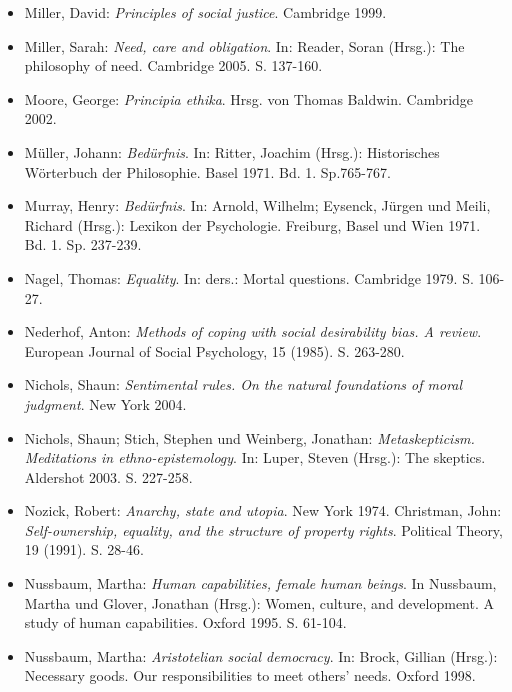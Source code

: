\documentclass[a4paper]{thesis}
\begin{document}
\begin{itemize}[leftmargin=1.5em,label={},itemindent=-1.5em, itemsep=-1ex]
\item Miller, David: \textit{Principles of social justice}. Cambridge 1999.

\item Miller, Sarah: \textit{Need, care and obligation}. In: Reader, Soran (Hrsg.): The philosophy of need. Cambridge 2005. S. 137-160.

\item Moore, George: \textit{Principia ethika}. Hrsg. von Thomas Baldwin. Cambridge 2002.

\item Müller, Johann: \textit{Bedürfnis}. In: Ritter, Joachim (Hrsg.): Historisches Wörterbuch der Philosophie. Basel 1971. Bd. 1. Sp.765-767.

\item Murray, Henry: \textit{Bedürfnis}. In: Arnold, Wilhelm; Eysenck, Jürgen und Meili, Richard (Hrsg.): Lexikon der Psychologie. Freiburg, Basel und Wien 1971. Bd. 1. Sp. 237-239.

\item Nagel, Thomas: \textit{Equality}. In: ders.: Mortal questions. Cambridge 1979. S. 106-27.

\item Nederhof, Anton: \textit{Methods of coping with social desirability bias. A review}. European Journal of Social Psychology, 15 (1985). S. 263-280.

\item Nichols, Shaun: \textit{Sentimental rules. On the natural foundations of moral judgment}. New York 2004.

\item Nichols, Shaun; Stich, Stephen und Weinberg, Jonathan: \textit{Metaskepticism. Meditations in ethno-epistemology}. In: Luper, Steven (Hrsg.): The skeptics. Aldershot 2003. S. 227-258.

\item Nozick, Robert: \textit{Anarchy, state and utopia}. New York 1974. Christman, John: \textit{Self-ownership, equality, and the structure of property rights}. Political Theory, 19 (1991). S. 28-46.

\item Nussbaum, Martha: \textit{Human capabilities, female human beings}. In Nussbaum, Martha und Glover, Jonathan (Hrsg.): Women, culture, and development. A study of human capabilities. Oxford 1995. S. 61-104.

\item Nussbaum, Martha: \textit{Aristotelian social democracy}. In: Brock, Gillian (Hrsg.): Necessary goods. Our responsibilities to meet others' needs. Oxford 1998.


\end{itemize}
\end{document}
